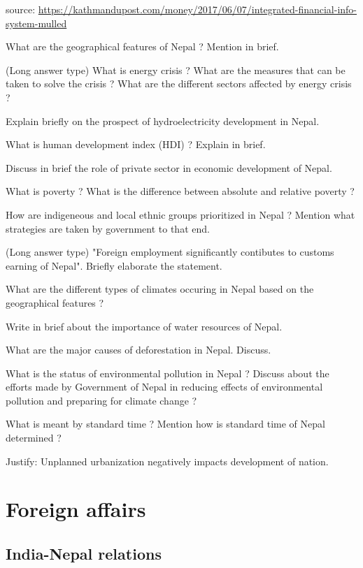 \documentclass[
  openany]{book}
\newcommand{\question}{\item}
\begin{document}
\begin{questions}
source: \url{https://kathmandupost.com/money/2017/06/07/integrated-financial-info-system-mulled}

\question What are the geographical features of Nepal ? Mention in brief.


\question (Long answer type) What is energy crisis ? What are the measures that can be taken to solve the crisis ? What are the different sectors affected by energy crisis ?

\question Explain briefly on the prospect of hydroelectricity development in Nepal.

\question What is human development index (HDI) ? Explain in brief.

\question Discuss in brief the role of private sector in economic development of Nepal. 

\question What is poverty ? What is the difference between absolute and relative poverty ?

\question How are indigeneous and local ethnic groups prioritized in Nepal ? Mention what strategies are taken by government to that end.

\question (Long answer type) "Foreign employment significantly contibutes to customs earning of Nepal". Briefly elaborate the statement.

\question What are the different types of climates occuring in Nepal based on the geographical features ?

\question Write in brief about the importance of water resources of Nepal.

\question What are the major causes of deforestation in Nepal. Discuss.

\question What is the status of environmental pollution in Nepal ? Discuss about the efforts made by Government of Nepal in reducing effects of environmental pollution and preparing for climate change ?

\question What is meant by standard time ? Mention how is standard time of Nepal determined ?

\question Justify: Unplanned urbanization negatively impacts development of nation.

\end{questions}

\hypertarget{foreign-affairs}{%
\chapter{Foreign affairs}\label{foreign-affairs}}

\hypertarget{india-nepal-relations}{%
\section{India-Nepal relations}\label{india-nepal-relations}}
\end{document}
